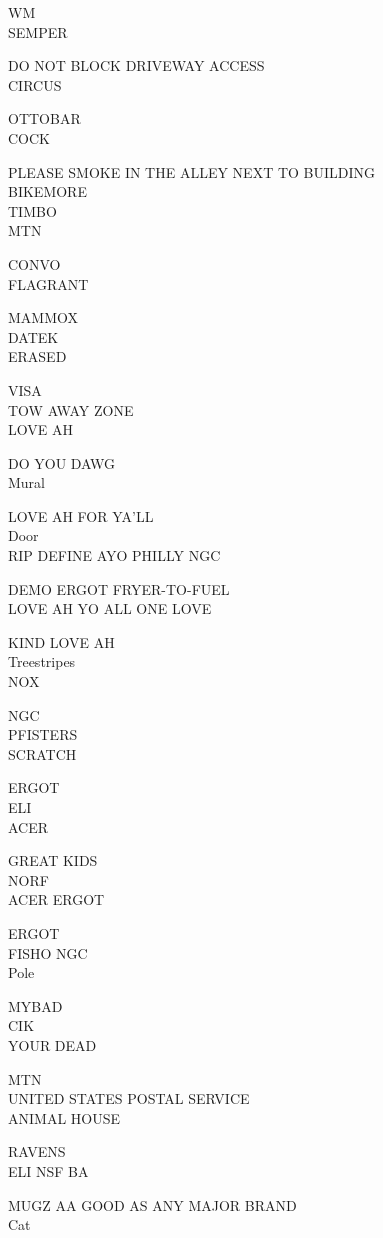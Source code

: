 \documentclass[10pt,letterpaper]{article}
\begin{document}
WM\\
SEMPER

DO NOT BLOCK DRIVEWAY ACCESS\\
CIRCUS

OTTOBAR\\
COCK

PLEASE SMOKE IN THE ALLEY NEXT TO BUILDING\\
BIKEMORE\\
TIMBO\\
MTN

CONVO\\
FLAGRANT

MAMMOX\\
DATEK\\
ERASED

VISA\\
TOW AWAY ZONE\\
LOVE AH

DO YOU DAWG\\
Mural

LOVE AH FOR YA'LL\\
Door\\
RIP DEFINE AYO PHILLY NGC

DEMO ERGOT FRYER{-}TO{-}FUEL\\
LOVE AH YO ALL ONE LOVE

KIND LOVE AH\\
Treestripes\\
NOX

NGC\\
PFISTERS\\
SCRATCH

ERGOT\\
ELI\\
ACER

GREAT KIDS\\
NORF\\
ACER ERGOT

ERGOT\\
FISHO NGC\\
Pole

MYBAD\\
CIK\\
YOUR DEAD

MTN\\
UNITED STATES POSTAL SERVICE\\
ANIMAL HOUSE

RAVENS\\
ELI NSF BA

MUGZ AA GOOD AS ANY MAJOR BRAND\\
Cat
\end{document}
